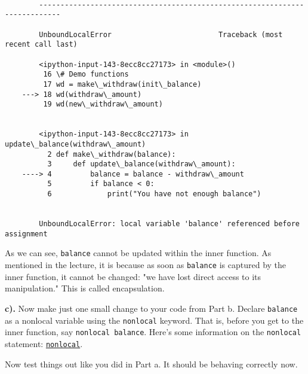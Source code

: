 \documentclass[11pt]{article}
\begin{document}
    \begin{Verbatim}[commandchars=\\\{\}]

        ---------------------------------------------------------------------------

        UnboundLocalError                         Traceback (most recent call last)

        <ipython-input-143-8ecc8cc27173> in <module>()
         16 \# Demo functions
         17 wd = make\_withdraw(init\_balance)
    ---> 18 wd(withdraw\_amount)
         19 wd(new\_withdraw\_amount)


        <ipython-input-143-8ecc8cc27173> in update\_balance(withdraw\_amount)
          2 def make\_withdraw(balance):
          3     def update\_balance(withdraw\_amount):
    ----> 4         balance = balance - withdraw\_amount
          5         if balance < 0:
          6             print("You have not enough balance")


        UnboundLocalError: local variable 'balance' referenced before assignment

    \end{Verbatim}

    As we can see, \texttt{balance} cannot be updated within the inner
function. As mentioned in the lecture, it is because as soon as
\texttt{balance} is captured by the inner function, it cannot be
changed: "we have lost direct access to its manipulation." This is
called encapsulation.

    \textbf{c).} Now make just one small change to your code from Part b.
Declare \texttt{balance} as a nonlocal variable using the
\texttt{nonlocal} keyword. That is, before you get to the inner
function, say \texttt{nonlocal\ balance}. Here's some information on the
\texttt{nonlocal} statement:
\href{https://docs.python.org/3/reference/simple_stmts.html\#nonlocal}{\texttt{nonlocal}}.

Now test things out like you did in Part a. It should be behaving
correctly now.
\end{document}
